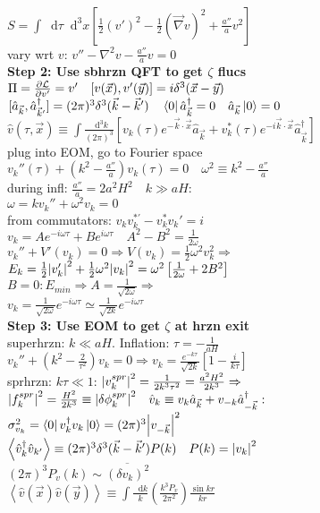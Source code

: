 \documentclass[12pt]{article}
\newcommand*\diff{\mathop{}\!\mathrm{d}}
\begin{document}
{	\\$S=\int\diff\tau\diff^3x\left[\frac{1}{2}(v')^2-\frac{1}{2}(\vec{\nabla}v)^2+\frac{a''}{a}v^2\right]$
	\\vary wrt $v$: $v''-\nabla^2v-\frac{a''}{a}v=0$
	\\\textbf{Step 2: Use sbhrzn QFT to get $\zeta$ flucs}
	\\$\Pi=\pdv{\mathcal{L}}{v'}=v' \quad [v(\vec{x}),v'(\vec{y})]=i\delta^3(\vec{x}-\vec{y})$
	\vspace{0.05cm}
	\\$[\hat{a}_{\vec{k}}, \hat{a}_{\vec{k}'}^\dagger]=(2\pi)^3\delta^3(\vec{k}-\vec{k}') \quad \bra0\hat{a}_{\vec{k}}^\dagger=0 \quad \hat{a}_{\vec{k}}\ket{0}=0$
	\\$\hat{v}(\tau,\vec{x})\equiv\int\frac{\diff^3k}{(2\pi)^3}\left[v_k(\tau)e^{-\vec{k}\cdot\vec{x}}\hat{a}_{\vec{k}}+v_k^*(\tau)e^{-i\vec{k}\cdot\vec{x}}\hat{a}_{\vec{k}}^\dagger\right]$
	\\plug into EOM, go to Fourier space
	\\$v_k''(\tau)+\left(k^2-\frac{a''}{a}\right)v_k(\tau)=0 \quad \omega^2\equiv k^2-\frac{a''}{a}$
	\\during infl: $\frac{a''}{a}=2a^2H^2 \quad k\gg aH:$
	\vspace{0.05cm}
	\\$\omega=k v_k''+\omega^2v_k=0$
	\\from commutators: $v_kv_k^{*'}-v_k^*v_k'=i$
	\vspace{0.05cm}
	\\$v_k=Ae^{-i\omega\tau}+Be^{i\omega\tau} \quad A^2-B^2=\frac{1}{2\omega}$
	\\$v_k''+V'(v_k)=0\Rightarrow V(v_k)=\frac{1}{2}\omega^2v_k^2\Rightarrow$
	\\$E_k=\frac{1}{2}\abs{v_k'}^2+\frac{1}{2}\omega^2\abs{v_k}^2=\omega^2\left[\frac{1}{2\omega}+2B^2\right]$
	\\$B=0: E_{min}\Rightarrow A=\frac{1}{\sqrt{2\omega}}\Rightarrow$
	\\$v_k=\frac{1}{\sqrt{2\omega}}e^{-i\omega\tau}\simeq\frac{1}{\sqrt{2k}}e^{-i\omega\tau}$
	\\\textbf{Step 3: Use EOM to get $\zeta$ at hrzn exit}
	\\superhrzn: $k\ll aH$. Inflation: $\tau=-\frac{1}{aH}$
	\\$v_k''+\left(k^2-\frac{2}{\tau^2}\right)v_k=0\Rightarrow v_k=\frac{e^{-k\tau}}{\sqrt{2k}}\left[1-\frac{i}{k\tau}\right]$
	\\sprhrzn: $k\tau \ll 1$: $\abs{v_k^{spr}}^2=\frac{1}{2k^3\tau^2}=\frac{a^2H^2}{2k^3}\Rightarrow$
	\\$\abs{f_k^{spr}}^2=\frac{H^2}{2k^3}\equiv \abs{\delta\phi_k^{spr}}^2 \quad \hat{v}_k\equiv v_k\hat{a}_{\vec{k}}+v_{-k}\hat{a}_{-\vec{k}}^\dagger:$
	\\$\sigma_{v_k}^2=\bra{0}v_k^\dagger v_k\ket{0}=(2\pi)^3\abs{v_{-\vec{k}}}^2$
	\\$\left<\hat{v}_k^\dagger\hat{v}_{k'}\right>\equiv(2\pi)^3\delta^3(\vec{k}-\vec{k}')P(k) \quad P(k)=\abs{v_k}^2$
	\\$(2\pi)^3P_v(k)\sim \overline{(\delta v_k)^2}$
	\\$\left<\hat{v}(\vec{x})\hat{v}(\vec{y})\right>\equiv\int\frac{\diff k}{k}\left(\frac{k^3P_v}{2\pi^2}\right)\frac{\sin kr}{kr}$
}
\end{document}
